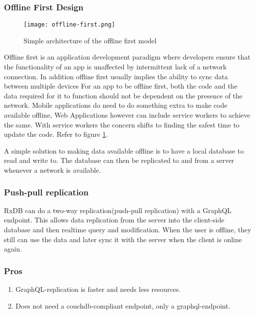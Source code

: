 \subsubsection{Offline First Design}

\begin{figure}[h!]
    \begin{center}
        \texttt{[image: offline-first.png]}
    \end{center}
    \caption{Simple architecture of the offline first model}
    \label{fig:offline-first}
\end{figure}

Offline first is an application development paradigm where developers ensure that the 
functionality of an app is unaffected by intermittent lack of a network connection. 
In addition offline first usually implies the ability to sync data between multiple devices
For an app to be offline first, both the code and the data required 
for it to function should not be dependent on the presence of the network.
Mobile applications do need to do something extra to make code available offline,
Web Applications however can include service workers to achieve the same.
With service workers the concern shifts to finding the safest time to update the code. 
Refer to figure \ref{fig:offline-first}.

A simple solution to making data available offline is to have a local database 
to read and write to. The database can then be replicated to and from a 
server whenever a network is available.~\cite{HasuraOfflineFirst}


\subsubsection{Push-pull replication}

RxDB can do a two-way replication(push-pull replication) with a GraphQL endpoint. 
This allows data replication from the server into the client-side database and then 
realtime query and modification.
When the user is offline, they still can use the data and later sync it with the server 
when the client is online again.

\subsubsection*{Pros}
\begin{enumerate}
    \item GraphQL-replication is faster and needs less resources.
    \item Does not need a couchdb-compliant endpoint, only a graphql-endpoint.
\end{enumerate}

